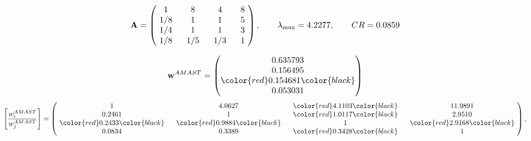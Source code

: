 \begin{example}
\begin{equation*}
\mathbf{A} =
\begin{pmatrix}
$\,\,$ 1 $\,\,$ & $\,\,$8$\,\,$ & $\,\,$4$\,\,$ & $\,\,$8 $\,\,$ \\
$\,\,$ 1/8$\,\,$ & $\,\,$ 1 $\,\,$ & $\,\,$1$\,\,$ & $\,\,$5 $\,\,$ \\
$\,\,$ 1/4$\,\,$ & $\,\,$ 1 $\,\,$ & $\,\,$ 1 $\,\,$ & $\,\,$3 $\,\,$ \\
$\,\,$ 1/8$\,\,$ & $\,\,$ 1/5$\,\,$ & $\,\,$ 1/3$\,\,$ & $\,\,$ 1  $\,\,$ \\
\end{pmatrix},
\qquad
\lambda_{\max} =
4.2277,
\qquad
CR = 0.0859
\end{equation*}

\begin{equation*}
\mathbf{w}^{AMAST} =
\begin{pmatrix}
0.635793\\
0.156495\\
\color{red} 0.154681\color{black} \\
0.053031
\end{pmatrix}\end{equation*}
\begin{equation*}
\left[ \frac{{w}^{AMAST}_i}{{w}^{AMAST}_j} \right] =
\begin{pmatrix}
$\,\,$ 1 $\,\,$ & $\,\,$4.0627$\,\,$ & $\,\,$\color{red} 4.1103\color{black} $\,\,$ & $\,\,$11.9891$\,\,$ \\
$\,\,$0.2461$\,\,$ & $\,\,$ 1 $\,\,$ & $\,\,$\color{red} 1.0117\color{black} $\,\,$ & $\,\,$2.9510  $\,\,$ \\
$\,\,$\color{red} 0.2433\color{black} $\,\,$ & $\,\,$\color{red} 0.9884\color{black} $\,\,$ & $\,\,$ 1 $\,\,$ & $\,\,$\color{red} 2.9168\color{black}  $\,\,$ \\
$\,\,$0.0834$\,\,$ & $\,\,$0.3389$\,\,$ & $\,\,$\color{red} 0.3428\color{black} $\,\,$ & $\,\,$ 1  $\,\,$ \\
\end{pmatrix},
\end{equation*}


\end{example}
